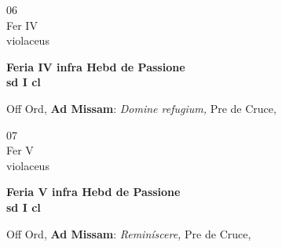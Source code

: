 \documentclass[10pt, openany]{book}
\begin{document}
        \begin{center}
            \begin{minipage}{3.5in}
                \vspace{2em}
                \begin{minipage}{0.5in}
                    {\Huge 06} \\
                    {\normalsize Fer IV} \\
                    {\normalsize violaceus}
                \end{minipage}
                \begin{minipage}{3.0in}
                    \textbf{ \large Feria IV infra Hebd de Passione \\
                    \textnormal{\normalsize sd I cl}} \\ 
                \end{minipage}
                \begin{justify}Off Ord, \textbf{Ad Missam}: \textit{Domine refugium,} Pre de Cruce,  
                \end{justify}
            \end{minipage}
        \end{center}
    
        \begin{center}
            \begin{minipage}{3.5in}
                \vspace{2em}
                \begin{minipage}{0.5in}
                    {\Huge 07} \\
                    {\normalsize Fer V} \\
                    {\normalsize violaceus}
                \end{minipage}
                \begin{minipage}{3.0in}
                    \textbf{ \large Feria V infra Hebd de Passione \\
                    \textnormal{\normalsize sd I cl}} \\ 
                \end{minipage}
                \begin{justify}Off Ord, \textbf{Ad Missam}: \textit{Reminíscere,} Pre de Cruce,  
                \end{justify}
            \end{minipage}
        \end{center}
    
\end{document}
